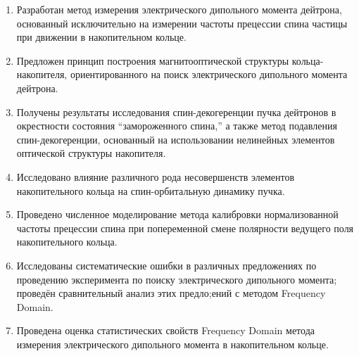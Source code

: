 
\begin{enumerate}
	\item Разработан метод измерения электрического дипольного момента дейтрона, 
	основанный исключительно на измерении частоты прецессии спина частицы 
	при движении в накопительном кольце.
	\item Предложен принцип построения магнитооптической структуры кольца-накопителя, 
	ориентированного на поиск электрического дипольного момента дейтрона.
	\item Получены результаты исследования спин-декогеренции пучка дейтронов в окрестности 
	состояния ``замороженного спина,'' а также метод подавления спин-декогеренции, основанный на использовании нелинейных элементов оптической структуры накопителя.
	\item Исследовано влияние различного рода несовершенств элементов накопительного кольца 
	на спин-орбитальную динамику пучка.
	\item Проведено численное моделирование метода калибровки нормализованной частоты прецессии спина 
	при попеременной смене полярности ведущего поля накопительного кольца.
	\item Исследованы систематические ошибки в различных предложениях по проведению эксперимента 
	по поиску электрического дипольного момента; проведён сравнительный анализ этих предло;ений 
	с методом Frequency Domain.
	\item Проведена оценка статистических свойств Frequency Domain метода измерения 
	электрического дипольного момента в накопительном кольце.
\end{enumerate}
